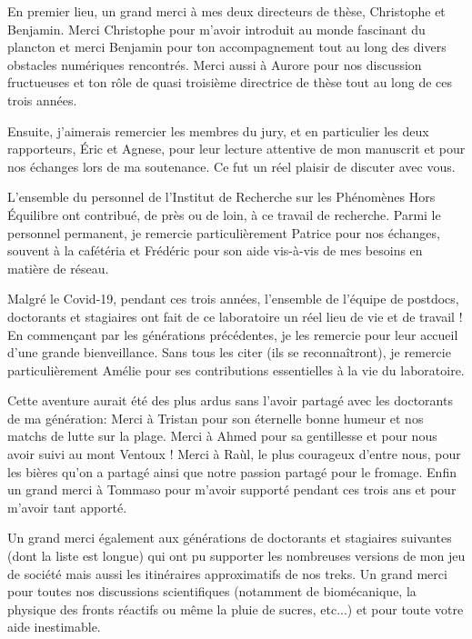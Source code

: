\begin{acknowledgements}

En premier lieu, un grand merci à mes deux directeurs de thèse, Christophe et Benjamin. Merci Christophe pour m'avoir introduit au monde fascinant du plancton et merci Benjamin pour ton accompagnement tout au long des divers obstacles numériques rencontrés.
Merci aussi à Aurore pour nos discussion fructueuses et ton rôle de quasi troisième directrice de thèse tout au long de ces trois années.

Ensuite, j'aimerais remercier les membres du jury, et en particulier les deux rapporteurs, Éric et Agnese, pour leur lecture attentive de mon manuscrit et pour nos échanges lors de ma soutenance. 
Ce fut un réel plaisir de discuter avec vous.

L'ensemble du personnel de l'Institut de Recherche sur les Phénomènes Hors Équilibre ont contribué, de près ou de loin, à ce travail de recherche. 
Parmi le personnel permanent, je remercie particulièrement Patrice pour nos échanges, souvent à la cafétéria et Frédéric pour son aide vis-à-vis de mes besoins en matière de réseau.

Malgré le Covid-19, pendant ces trois années, l'ensemble de l'équipe de postdocs, doctorants et stagiaires ont fait de ce laboratoire un réel lieu de vie et de travail !
En commençant par les générations précédentes, je les remercie pour leur accueil d'une grande bienveillance. 
Sans tous les citer (ils se reconnaîtront), je remercie particulièrement Amélie pour ses contributions essentielles à la vie du laboratoire.

Cette aventure aurait été des plus ardus sans l'avoir partagé avec les doctorants de ma génération:
Merci à Tristan pour son éternelle bonne humeur et nos matchs de lutte sur la plage. 
Merci à Ahmed pour sa gentillesse et pour nous avoir suivi au mont Ventoux !
Merci à Raùl, le plus courageux d'entre nous, pour les bières qu'on a partagé ainsi que notre passion partagé pour le fromage.
Enfin un grand merci à Tommaso pour m'avoir supporté pendant ces trois ans et pour m'avoir tant apporté.

Un grand merci également aux générations de doctorants et stagiaires suivantes (dont la liste est longue) qui ont pu supporter les nombreuses versions de mon jeu de société mais aussi les itinéraires approximatifs de nos treks. Un grand merci pour toutes nos discussions scientifiques (notamment de biomécanique, la physique des fronts réactifs ou même la pluie de sucres, etc...) et pour toute votre aide inestimable.


\end{acknowledgements}
